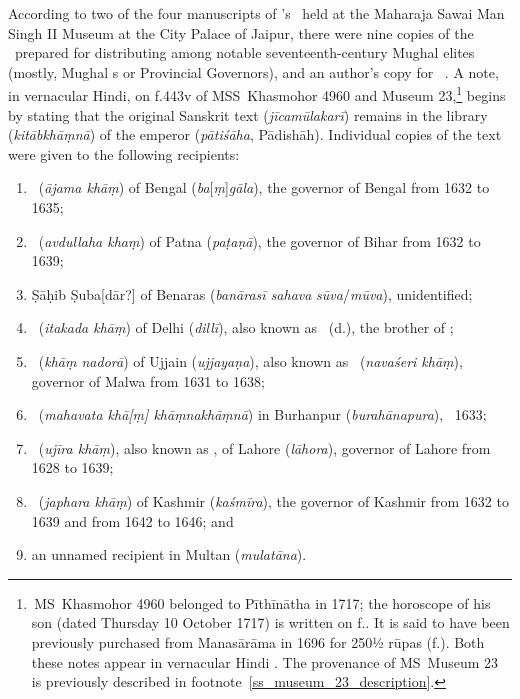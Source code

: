 According to two of the four manuscripts of \Nityananda's \Siddhantasindhu\ held at the Maharaja Sawai Man Singh II Museum at the City Palace of Jaipur, there were nine copies of the \Siddhantasindhu\ prepared for distributing among notable seventeenth-century Mughal elites (mostly, Mughal \Subadar s or Provincial Governors), and an author's copy for \Nityananda\ \parencite[142]{PingreeJaipur}. A note, in vernacular Hindi, on f.\thinspace 443v of MSS~Khasmohor 4960 and Museum 23,\footnote{\,MS~Khasmohor 4960 belonged to Pīthīnātha in 1717; the horoscope of his son (dated Thursday 10 October 1717) is written on f.. It is said to have been previously purchased from Manasārāma in 1696 for 250\thinspace ½ rūpas (f.). Both these notes appear in vernacular Hindi \parencite[138--142]{PingreeJaipur}. The provenance of MS~Museum 23 is previously described in footnote~\ref{ss_museum_23_description}.} begins by stating that the original Sanskrit text (\textit{jīcamūlakarī}) remains in the library (\textit{kitābkhāṃnā}) of the emperor (\textit{pātiśāha}, Pādishāh). Individual copies of the text were given to the following recipients:   
\begin{enumerate}[topsep=0pt]
    \item \AzamKhan\ (\textit{ājama khāṃ}) of Bengal (\textit{ba}[\textit{ṃ}]\textit{gāla}), the governor of Bengal from 1632 to 1635;
    \item \AbdallahKhanFiruzJung\ (\textit{avdullaha khaṃ}) of Patna (\textit{paṭaṇā}), the governor of Bihar from 1632 to 1639;
    \item Ṣāḥib Ṣuba[dār?] of Benaras (\textit{banārasī sahava} \textit{sūva}/\textit{mūva}), unidentified;
    \item \ItiqadKhan\ (\textit{itakada khāṃ}) of Delhi (\textit{dillī}), also known as \MirzaShapur\ (d.), the brother of \AsafKhanshort;
    \item \KhwajaSabirKhanDauran\ (\textit{khāṃ nadorā}) of Ujjain (\textit{ujjayaṇa}), also known as \NasiriKhan\ (\textit{navaśeri khāṃ}), governor of Malwa from
    1631 to 1638;
    \item \MahabatKhanKhaniKhanan\ (\textit{mahavata khā[ṃ] khāṃnakhāṃnā}) in Burhanpur (\textit{burahānapura}), \circa \post\ 1633;
     \item \VazirKhan\ (\textit{ujīra khāṃ}), also known as \HakimShaykhIlmalDinAnsari, of Lahore (\textit{lāhora}), governor of Lahore from 1628 to 1639;
     \item \ZafarKhanAhsan\ (\textit{japhara khāṃ}) of Kashmir (\textit{kaśmīra}), the governor of Kashmir from 1632 to 1639 and from 1642 to 1646; and
     \item an unnamed recipient in Multan (\textit{mulatāna}).
\end{enumerate}    

